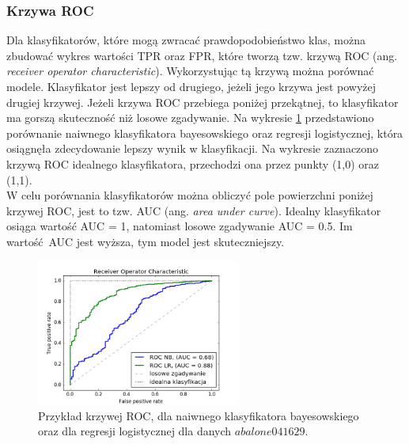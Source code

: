 \subsubsection{Krzywa ROC}
Dla klasyfikatorów, które mogą zwracać prawdopodobieństwo klas, można zbudować wykres wartości TPR oraz FPR, które tworzą tzw. krzywą ROC (ang. \textit{receiver operator characteristic}). Wykorzystując tą krzywą można porównać modele. Klasyfikator jest lepszy od drugiego, jeżeli jego krzywa jest powyżej drugiej krzywej. Jeżeli krzywa ROC przebiega poniżej przekątnej, to klasyfikator ma gorszą skuteczność niż losowe zgadywanie. Na wykresie \ref{fig:krzywa_roc} przedstawiono porównanie naiwnego klasyfikatora bayesowskiego oraz regresji logistycznej, która osiągnęła zdecydowanie lepszy wynik w klasyfikacji. Na wykresie zaznaczono krzywą ROC idealnego klasyfikatora, przechodzi ona przez punkty (1,0) oraz (1,1).\\
W celu porównania klasyfikatorów można obliczyć pole powierzchni poniżej krzywej ROC, jest to tzw. AUC (ang. \textit{area under curve}). Idealny klasyfikator osiąga wartość AUC = 1, natomiast losowe zgadywanie AUC = 0.5. Im wartość AUC jest wyższa, tym model jest skuteczniejszy.
\begin{figure}[h]
	\centering
	\includegraphics[width=0.6\textwidth]{./images/roc.png}
	\caption{Przykład krzywej ROC, dla naiwnego klasyfikatora bayesowskiego oraz dla regresji logistycznej dla danych $abalone041629$.}
	\label{fig:krzywa_roc}
\end{figure}

